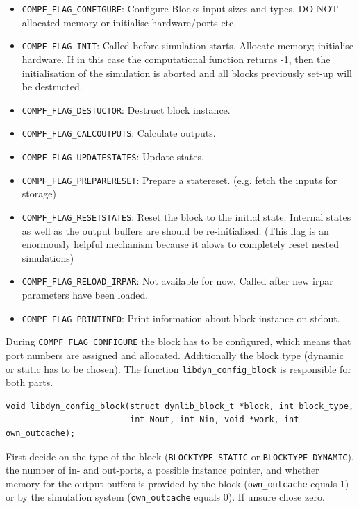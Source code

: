 \documentclass[%
	pdftex,%
	a4paper,%
	oneside,%
	11pt,%
	halfparskip,%
	headsepline,%
	bibtotocnumbered,%
	idxtotoc%
]{scrartcl}
\begin{document}
\begin{itemize}
 \item \texttt{COMPF\_FLAG\_CONFIGURE}: Configure Blocks input sizes and types. DO NOT allocated memory or initialise hardware/ports etc.
 \item \texttt{COMPF\_FLAG\_INIT}: Called before simulation starts. Allocate memory; initialise hardware. If in this case the computational function returns -1, then the initialisation of the simulation is aborted and all blocks previously set-up will be destructed.
 \item \texttt{COMPF\_FLAG\_DESTUCTOR}: Destruct block instance.
 \item \texttt{COMPF\_FLAG\_CALCOUTPUTS}: Calculate outputs.
 \item \texttt{COMPF\_FLAG\_UPDATESTATES}: Update states.
 \item \texttt{COMPF\_FLAG\_PREPARERESET}: Prepare a statereset. (e.g. fetch the inputs  for storage)
 \item \texttt{COMPF\_FLAG\_RESETSTATES}: Reset the block to the initial state: Internal states as well as the output buffers are should be re-initialised. (This flag is an enormously helpful mechanism because it alows to completely reset nested simulations)
 \item \texttt{COMPF\_FLAG\_RELOAD\_IRPAR}: Not available for now. Called after new irpar parameters have been loaded.
 \item \texttt{COMPF\_FLAG\_PRINTINFO}: Print information about block instance on stdout.
\end{itemize}

During \texttt{COMPF\_FLAG\_CONFIGURE} the block has to be configured, which means that port numbers are assigned and allocated. Additionally the block type (dynamic or static has to be chosen). The function \texttt{libdyn\_config\_block} is responsible for both parts.

\begin{verbatim}
void libdyn_config_block(struct dynlib_block_t *block, int block_type, 
                         int Nout, int Nin, void *work, int own_outcache);
\end{verbatim}

First decide on the type of the block (\texttt{BLOCKTYPE\_STATIC} or \texttt{BLOCKTYPE\_DYNAMIC}), the number of in- and out-ports, a possible instance pointer, and whether memory for the output buffers is provided by the block (\texttt{own\_outcache} equals 1) or by the simulation system (\texttt{own\_outcache} equals 0). If unsure chose zero.
\end{document}
